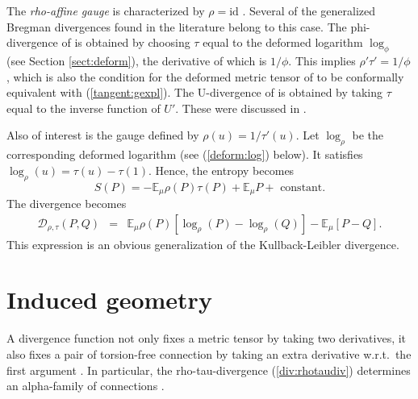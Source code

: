\documentclass[graybox]{svmult}
\newcommand{\be}{\begin{equation}}
\newcommand{\ee}{\end{equation}}
\newcommand{\beq}{\begin{eqnarray}}
\newcommand{\eeq}{\end{eqnarray}}
\newcommand{\id}{\mbox{id}}
\newcommand{\Eo}{\mathbb E}
\newcommand{\Ddiv}{\mathcal{D}}
\begin{document}
The {\em rho-affine gauge} is characterized by $\rho=\id$ .
Several of the generalized Bregman divergences found in the literature
belong to this case. The phi-divergence of \cite{NJ04} is obtained
by choosing $\tau$ equal to the deformed logarithm $\log_\phi$ (see Section \ref {sect:deform}),
the derivative of which is $1/\phi$. This implies $\rho'\tau'=1/\phi$,
which is also the condition for the deformed metric tensor of \cite{NJ04}
to be conformally equivalent with (\ref {tangent:gexpl}).
The U-divergence of \cite{ES06} is obtained by taking $\tau$ equal to the
inverse function of $U'$. These were discussed in \cite{ZN17,NZ17,NZ18}.

Also of interest is the gauge defined by $\rho(u)=1/\tau'(u)$.
Let $\log_\rho$ be the corresponding deformed logarithm (see (\ref {deform:log}) below).
It satisfies $\log_\rho(u)=\tau(u)-\tau(1)$. Hence, the entropy becomes
\be
S(P)=-\Eo_\mu\rho(P)\tau(P)+\Eo_\mu P+\mbox{ constant}.
\nonumber\ee
The divergence becomes
\beq
\Ddiv _{\rho,\tau}(P,Q)
&=&
\Eo_\mu\rho(P)\left[\log_\rho(P)-\log_\rho(Q)\right]-\Eo_\mu\left[P-Q\right].
\nonumber
\eeq
This expression is an obvious generalization of the Kullback-Leibler divergence.


\section{Induced geometry}
\label{sect:geometry}

A divergence function not only fixes a metric tensor by taking two derivatives,
it also fixes a pair of torsion-free connection by taking an extra
derivative w.r.t.~the first argument
\cite{eguchi1983} \cite{eguchi1985}. In particular,
the rho-tau-divergence  (\ref {div:rhotaudiv}) determines an alpha-family of
connections \cite{zhang2004a,zhang13,NZ17}.
\end{document}
